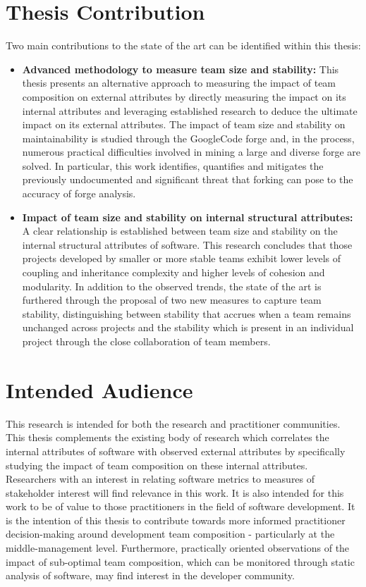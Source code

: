 \section{Thesis Contribution} %
Two main contributions to the state of the art can be identified within this thesis:

\begin{itemize}
\item \textbf{Advanced methodology to measure team size and stability:} This thesis presents an alternative approach to measuring the impact of team composition on external attributes by directly measuring the impact on its internal attributes and leveraging established research to deduce the ultimate impact on its external attributes. The impact of team size and stability on maintainability is studied through the GoogleCode forge and, in the process, numerous practical difficulties involved in mining a large and diverse forge are solved. In particular, this work identifies, quantifies and mitigates the previously undocumented and significant threat that forking can pose to the accuracy of forge analysis.

\item \textbf{Impact of team size and stability on internal structural attributes:} A clear relationship is established between team size and stability on the internal structural attributes of software. This research concludes that those projects developed by smaller or more stable teams exhibit lower levels of coupling and inheritance complexity and higher levels of cohesion and modularity. In addition to the observed trends, the state of the art is furthered through the proposal of two new measures to capture team stability, distinguishing between stability that accrues when a team remains unchanged across projects and the stability which is present in an individual project through the close collaboration of team members.
\end{itemize}

\section{Intended Audience} %
This research is intended for both the research and practitioner communities. This thesis complements the existing body of research which correlates the internal attributes of software with observed external attributes by specifically studying the impact of team composition on these internal attributes. Researchers with an interest in relating software metrics to measures of stakeholder interest will find relevance in this work. It is also intended for this work to be of value to those practitioners in the field of software development. It is the intention of this thesis to contribute towards more informed practitioner decision-making around development team composition - particularly at the middle-management level. Furthermore, practically oriented observations of the impact of sub-optimal team composition, which can be monitored through static analysis of software, may find interest in the developer community.

